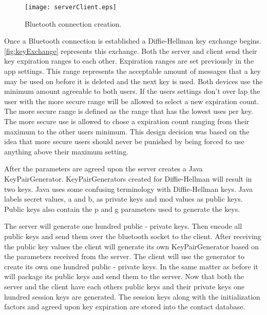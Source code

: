 \begin{figure}
  \texttt{[image: serverClient.eps]}
  \caption{Bluetooth connection creation.}
  \label{fig:serverClient}
\end{figure}

Once a Bluetooth connection is established a Diffie-Hellman key exchange begins.
\ref{fig:keyExchange} represents this exchange.
Both the server and client send their key expiration ranges to each other.
Expiration ranges are set previously in the app settings.
This range represents the acceptable amount of messages that a key may be used on before it is deleted and the next key is used.
Both devices use the minimum amount agreeable to both users.
If the users settings don't over lap the user with the more secure range will be allowed to select a new expiration count.
The more secure range is defined as the range that has the lowest uses per key.
The more secure use is allowed to chose a expiration count ranging from their maximum to the other users minimum.
This design decision was based on the idea that more secure users should never be punished by being forced to use anything above their maximum setting.

After the parameters are agreed upon the server creates a Java KeyPairGenerator.
KeyPairGenerators created for Diffie-Hellman will result in two keys.
Java uses some confusing terminology with Diffie-Hellman keys.
Java labels secret values, a and b, as private keys and mod values as public keys.
Public keys also contain the p and g parameters used to generate the keys.

The server will generate one hundred public - private keys.
Then encode all public keys and send them over the bluetooth socket to the client.
After receiving the public key values the client will generate its own KeyPairGenerator based on the parameters received from the server.
The client will use the generator to create its own one hundred public - private keys.
In the same matter as before it will package its public keys and send them to the server.
Now that both the server and the client have each others public keys and their private keys one hundred session keys are generated.
The session keys along with the initialization factors and agreed upon key expiration are stored into the contact database.

